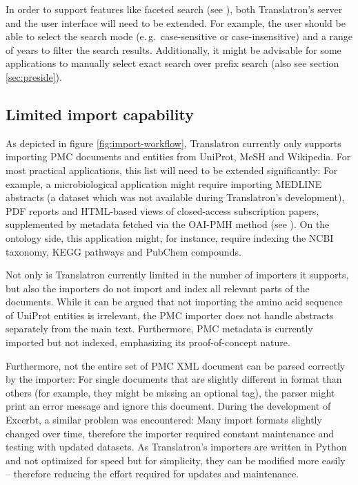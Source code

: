 \documentclass[a4paper, 12pt, twoside, reqn]{report}
\numberwithin{figure}{chapter}
\newtheorem[L]{boxedDefinition}{Definition}
\newtheorem[L]{boxedExample}{Example}
\newcommand{\eg}{e.\,g.\ }
\begin{document}
In order to support features like faceted search (see \cite{koren2008personalized}), both Translatron's server and the user interface will need to be extended. For example, the user should be able to select the search mode (\eg case-sensitive or case-insensitive) and a range of years to filter the search results. Additionally, it might be advisable for some applications to manually select exact search over prefix search (also see section \ref{sec:preside}).

\subsection{Limited import capability}\label{ssec:limited-import-capability}

As depicted in figure \vref{fig:import-workflow}, Translatron currently only supports importing PMC documents and entities from UniProt, MeSH and Wikipedia. For most practical applications, this list will need to be extended significantly: For example, a microbiological application might require importing MEDLINE abstracts (a dataset which was not available during Translatron's development), PDF reports and HTML-based views of closed-access subscription papers, supplemented by metadata fetched via the OAI-PMH method (see \cite{sompel2004resource}). On the ontology side, this application might, for instance, require indexing the NCBI taxonomy, KEGG pathways and PubChem compounds.

Not only is Translatron currently limited in the number of importers it supports, but also the importers do not import and index all relevant parts of the documents. While it can be argued that not importing the amino acid sequence of UniProt entities is irrelevant, the PMC importer does not handle abstracts separately from the main text. Furthermore, PMC metadata is currently imported but not indexed, emphasizing its proof-of-concept nature.

Furthermore, not the entire set of PMC XML document can be parsed correctly by the importer: For single documents that are slightly different in format than others (for example, they might be missing an optional tag), the parser might print an error message and ignore this document. During the development of Excerbt, a similar problem was encountered: Many import formats slightly changed over time, therefore the importer required constant maintenance and testing with updated datasets. As Translatron's importers are written in Python and not optimized for speed but for simplicity, they can be modified more easily -- therefore reducing the effort required for updates and maintenance.
\end{document}
